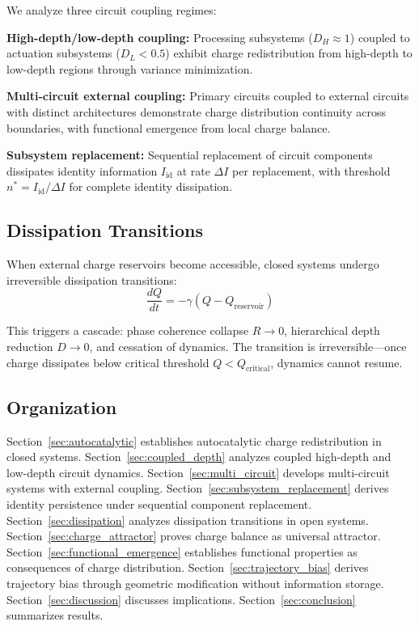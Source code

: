 \documentclass[12pt,a4paper]{article}
\theoremstyle{plain}
\theoremstyle{definition}
\theoremstyle{remark}
\begin{document}
We analyze three circuit coupling regimes:

\textbf{High-depth/low-depth coupling:} Processing subsystems ($D_H \approx 1$) coupled to actuation subsystems ($D_L < 0.5$) exhibit charge redistribution from high-depth to low-depth regions through variance minimization.

\textbf{Multi-circuit external coupling:} Primary circuits coupled to external circuits with distinct architectures demonstrate charge distribution continuity across boundaries, with functional emergence from local charge balance.

\textbf{Subsystem replacement:} Sequential replacement of circuit components dissipates identity information $I_{\text{id}}$ at rate $\Delta I$ per replacement, with threshold $n^* = I_{\text{id}} / \Delta I$ for complete identity dissipation.

\subsection{Dissipation Transitions}

When external charge reservoirs become accessible, closed systems undergo irreversible dissipation transitions:
\begin{equation}
\frac{dQ}{dt} = -\gamma (Q - Q_{\text{reservoir}})
\end{equation}

This triggers a cascade: phase coherence collapse $R \to 0$, hierarchical depth reduction $D \to 0$, and cessation of dynamics. The transition is irreversible—once charge dissipates below critical threshold $Q < Q_{\text{critical}}$, dynamics cannot resume.

\subsection{Organization}

Section~\ref{sec:autocatalytic} establishes autocatalytic charge redistribution in closed systems. Section~\ref{sec:coupled_depth} analyzes coupled high-depth and low-depth circuit dynamics. Section~\ref{sec:multi_circuit} develops multi-circuit systems with external coupling. Section~\ref{sec:subsystem_replacement} derives identity persistence under sequential component replacement. Section~\ref{sec:dissipation} analyzes dissipation transitions in open systems. Section~\ref{sec:charge_attractor} proves charge balance as universal attractor. Section~\ref{sec:functional_emergence} establishes functional properties as consequences of charge distribution. Section~\ref{sec:trajectory_bias} derives trajectory bias through geometric modification without information storage. Section~\ref{sec:discussion} discusses implications. Section~\ref{sec:conclusion} summarizes results.
\end{document}
